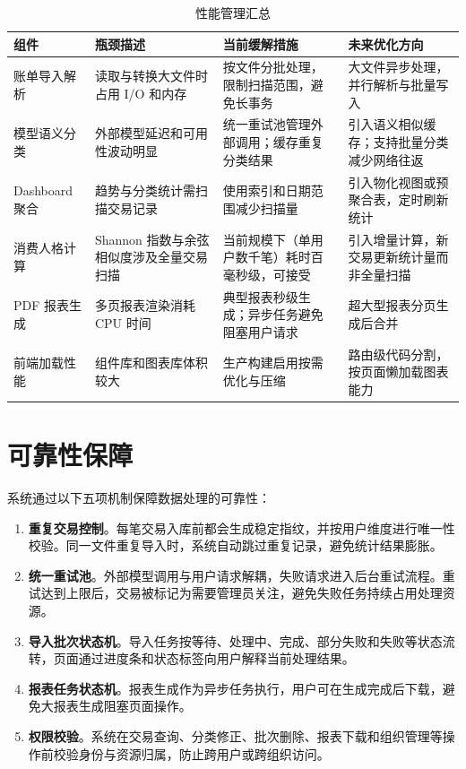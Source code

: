\begin{table}[H]
  \centering
  \small
  \caption{性能管理汇总}
  \label{tab:performance}
  \begin{tabular}{@{}p{2.2cm} p{2.8cm} p{3.8cm} p{4.0cm}@{}}
    \toprule
    \textbf{组件} & \textbf{瓶颈描述} & \textbf{当前缓解措施} & \textbf{未来优化方向} \\
    \midrule
    账单导入解析 & 读取与转换大文件时占用 I/O 和内存 & 按文件分批处理，限制扫描范围，避免长事务 & 大文件异步处理，并行解析与批量写入 \\
    \hline
    模型语义分类 & 外部模型延迟和可用性波动明显 & 统一重试池管理外部调用；缓存重复分类结果 & 引入语义相似缓存；支持批量分类减少网络往返 \\
    \hline
    Dashboard 聚合 & 趋势与分类统计需扫描交易记录 & 使用索引和日期范围减少扫描量 & 引入物化视图或预聚合表，定时刷新统计 \\
    \hline
    消费人格计算 & Shannon 指数与余弦相似度涉及全量交易扫描 & 当前规模下（单用户数千笔）耗时百毫秒级，可接受 & 引入增量计算，新交易更新统计量而非全量扫描 \\
    \hline
    PDF 报表生成 & 多页报表渲染消耗 CPU 时间 & 典型报表秒级生成；异步任务避免阻塞用户请求 & 超大型报表分页生成后合并 \\
    \hline
    前端加载性能 & 组件库和图表库体积较大 & 生产构建启用按需优化与压缩 & 路由级代码分割，按页面懒加载图表能力 \\
    \bottomrule
  \end{tabular}
\end{table}

\section{可靠性保障}

系统通过以下五项机制保障数据处理的可靠性：

\begin{enumerate}
  \item \textbf{重复交易控制}。每笔交易入库前都会生成稳定指纹，并按用户维度进行唯一性校验。同一文件重复导入时，系统自动跳过重复记录，避免统计结果膨胀。
  \item \textbf{统一重试池}。外部模型调用与用户请求解耦，失败请求进入后台重试流程。重试达到上限后，交易被标记为需要管理员关注，避免失败任务持续占用处理资源。
  \item \textbf{导入批次状态机}。导入任务按等待、处理中、完成、部分失败和失败等状态流转，页面通过进度条和状态标签向用户解释当前处理结果。
  \item \textbf{报表任务状态机}。报表生成作为异步任务执行，用户可在生成完成后下载，避免大报表生成阻塞页面操作。
  \item \textbf{权限校验}。系统在交易查询、分类修正、批次删除、报表下载和组织管理等操作前校验身份与资源归属，防止跨用户或跨组织访问。
\end{enumerate}

